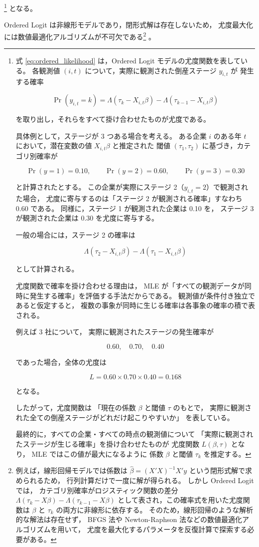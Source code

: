 \footnote{
式 \eqref{eq:ordered_likelihood} は，Ordered Logit モデルの尤度関数を表している。
各観測値 $(i,t)$ について，実際に観測された倒産ステージ $y_{i,t}$ が
発生する確率

\[
\Pr(y_{i,t}=k)
=
\Lambda(\tau_k - X_{i,t}\beta)
-
\Lambda(\tau_{k-1} - X_{i,t}\beta)
\]

を取り出し，それらをすべて掛け合わせたものが尤度である。

具体例として，ステージが 3 つある場合を考える。
ある企業 $i$ のある年 $t$ において，潜在変数の値 $X_{i,t}\beta$ と推定された
閾値 $(\tau_1,\tau_2)$ に基づき，カテゴリ別確率が

\[
\Pr(y=1)=0.10,\qquad
\Pr(y=2)=0.60,\qquad
\Pr(y=3)=0.30
\]

と計算されたとする。
この企業が実際にステージ 2（$y_{i,t}=2$）で観測された場合，
尤度に寄与するのは「ステージ 2 が観測される確率」すなわち 0.60 である。
同様に，ステージ 1 が観測された企業は 0.10 を，
ステージ 3 が観測された企業は 0.30 を尤度に寄与する。

一般の場合には，ステージ 2 の確率は

\[
\Lambda(\tau_2 - X_{i,t}\beta)
-
\Lambda(\tau_1 - X_{i,t}\beta)
\]

として計算される。

尤度関数で確率を掛け合わせる理由は，
MLE が「すべての観測データが同時に発生する確率」を評価する手法だからである。
観測値が条件付き独立であると仮定すると，
複数の事象が同時に生じる確率は各事象の確率の積で表される。

例えば 3 社について，
実際に観測されたステージの発生確率が

\[
0.60,\quad 0.70,\quad 0.40
\]

であった場合，全体の尤度は

\[
L
=
0.60
\times
0.70
\times
0.40
=
0.168
\]

となる。

したがって，尤度関数は
「現在の係数 $\beta$ と閾値 $\tau$ のもとで，
実際に観測された全ての倒産ステージがどれだけ起こりやすいか」
を表している。

最終的に，すべての企業・すべての時点の観測値について
「実際に観測されたステージが生じる確率」を掛け合わせたものが
尤度関数 \(L(\beta,\tau)\) となり，
MLE ではこの値が最大になるように
係数 $\beta$ と閾値 $\tau_k$ を推定する。
}
となる。

Ordered Logit は非線形モデルであり，閉形式解は存在しないため，
尤度最大化には数値最適化アルゴリズムが不可欠である\footnote{
例えば，線形回帰モデルでは係数は
$\hat{\beta}=(X'X)^{-1}X'y$ という閉形式解で求められるため，
行列計算だけで一度に解が得られる。
しかし Ordered Logit では，
カテゴリ別確率がロジスティック関数の差分
$\Lambda(\tau_k - X\beta)-\Lambda(\tau_{k-1}-X\beta)$
として表され，この確率式を用いた尤度関数は
$\beta$ と $\tau_k$ の両方に非線形に依存する。
そのため，線形回帰のような解析的な解法は存在せず，
BFGS 法や Newton-Raphson 法などの数値最適化アルゴリズムを用いて，
尤度を最大化するパラメータを反復計算で探索する必要がある。
}
。

